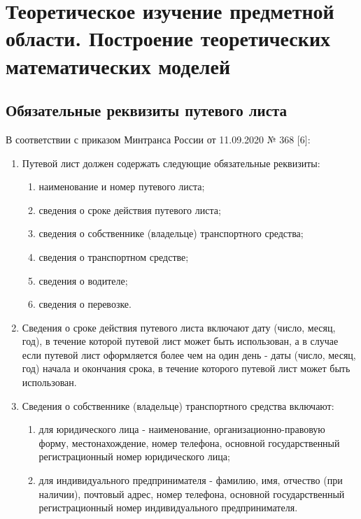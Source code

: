 \documentclass[../nirs.tex]{subfiles}
\begin{document}
\section{Теоретическое изучение предметной области. Построение теоретических
математических моделей}

\subsection{Обязательные реквизиты путевого листа}
В соответствии с приказом Минтранса России от 11.09.2020 № 368  [6]:
\begin{enumerate}
	\item Путевой лист должен содержать следующие обязательные реквизиты:

	\begin{enumerate}
		\item наименование и номер путевого листа;
		\item сведения о сроке действия путевого листа;
		\item сведения о собственнике (владельце) транспортного средства;
		\item сведения о транспортном средстве;
		\item сведения о водителе;
		\item сведения о перевозке.
	\end{enumerate}

	\item Сведения о сроке действия путевого листа включают дату (число, месяц,
		год), в течение которой путевой лист может быть использован, а в случае
		если путевой лист оформляется более чем на один день - даты (число,
		месяц, год) начала и окончания срока, в течение которого путевой лист
		может быть использован.
	\item Сведения о собственнике (владельце) транспортного средства включают:

	\begin{enumerate}
		\item для юридического лица - наименование, организационно-правовую
			форму, местонахождение, номер телефона, основной государственный
			регистрационный номер юридического лица;
		\item для индивидуального предпринимателя - фамилию, имя, отчество (при
			наличии), почтовый адрес, номер телефона, основной государственный
			регистрационный номер индивидуального предпринимателя.
	\end{enumerate}


\end{enumerate}
\end{document}
